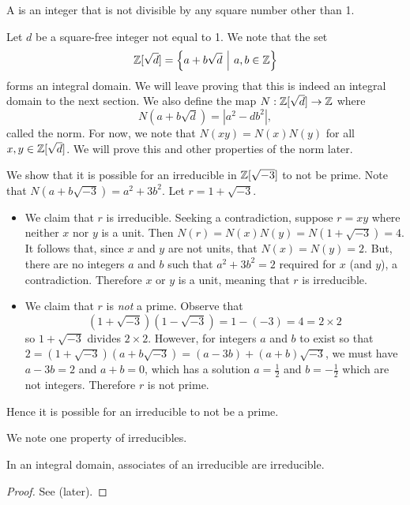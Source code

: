 \begin{definition}
    A  is an integer that is not divisible by any square number other than 1.
\end{definition}

Let $d$ be a square-free integer not equal to 1. We note that the set
\[
    \Z[\sqrt{d}] = \left\{a + b\sqrt{d} \vert a,b \in \Z\right\}
\]
forms an integral domain. We will leave proving that this is indeed an integral domain to the next section. We also define the map $N: \mathbb{Z}[\sqrt{d}] \to \mathbb{Z}$ where
\[
    N(a+b\sqrt{d}) = |a^2 - db^2|,
\]
called the norm. For now, we note that $N(xy) = N(x)N(y)$ for all $x, y \in \mathbb{Z}[\sqrt{d}]$. We will prove this and other properties of the norm later.

\begin{example}
    We show that it is possible for an irreducible in $\mathbb{Z}[\sqrt{-3}]$ to not be prime. Note that $N(a+b\sqrt{-3}) = a^2 + 3b^2$. Let $r = 1 + \sqrt{-3}$.
    \begin{itemize}
        \item We claim that $r$ is irreducible. Seeking a contradiction, suppose $r = xy$ where neither $x$ nor $y$ is a unit. Then $N(r) = N(x)N(y) = N(1+\sqrt{-3}) = 4$. It follows that, since $x$ and $y$ are not units, that $N(x) = N(y) = 2$. But, there are no integers $a$ and $b$ such that $a^2 + 3b^2 = 2$ required for $x$ (and $y$), a contradiction. Therefore $x$ or $y$ is a unit, meaning that $r$ is irreducible.

        \item We claim that $r$ is \textit{not} a prime. Observe that
        \[
            (1+\sqrt{-3})(1-\sqrt{-3}) = 1-(-3) = 4 = 2 \times 2
        \]
        so $1 + \sqrt{-3}$ divides $2 \times 2$. However, for integers $a$ and $b$ to exist so that $2 = (1+\sqrt{-3})(a+b\sqrt{-3}) = (a-3b) + (a+b)\sqrt{-3}$, we must have $a - 3b = 2$ and $a + b = 0$, which has a solution $a = \frac12$ and $b = -\frac12$ which are not integers. Therefore $r$ is not prime.
    \end{itemize}
    Hence it is possible for an irreducible to not be a prime.
\end{example}

We note one property of irreducibles.
\begin{proposition}\label{prop-associates-of-irreducible-is-irreducible}
    In an integral domain, associates of an irreducible are irreducible.
\end{proposition}
\begin{proof}
    See  (later).
\end{proof}

